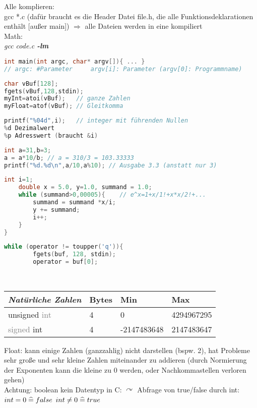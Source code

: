 \begin{multicols}{3}
Alle komplieren:\\
gcc *.c (dafür braucht es die Header Datei file.h, die alle Funktionsdeklarationen enthält [außer main]) $\Rightarrow$ alle Dateien werden in eine kompiliert \smallskip\\
Math:\\
\emph{gcc code.c \textbf{-lm}}
\HRule[4pt]
\begin{lstlisting}[language=C]
int main(int argc, char* argv[]){ ... } 
// argc: #Parameter		argv[i]: Parameter (argv[0]: Programmname)
\end{lstlisting}
\begin{lstlisting}[language=C]
char vBuf[128];
fgets(vBuf,128,stdin); 
myInt=atoi(vBuf);	// ganze Zahlen
myFloat=atof(vBuf); // Gleitkomma
\end{lstlisting}
\begin{lstlisting}[language=C]
printf("%04d",i);	// integer mit führenden Nullen
%d Dezimalwert
%p Adresswert (braucht &i)
\end{lstlisting}
\begin{lstlisting}[language=C]
int a=31,b=3;
a = a*10/b;	// a = 310/3 = 103.33333
printf("%d.%d\n",a/10,a%10); // Ausgabe 3.3 (anstatt nur 3)
\end{lstlisting}
\begin{lstlisting}[language=C]
	int i=1;
	double x = 5.0, y=1.0, summand = 1.0;
	while (summand>0,00005){	// e^x=1+x/1!+x*x/2!+...
		summand = summand *x/i;
		y += summand;
		i++;
	}
}
\end{lstlisting}
\begin{lstlisting}[language=C]
	while (operator != toupper('q')){
		fgets(buf, 128, stdin);
		operator = buf[0];
\end{lstlisting}
\HRule[4pt]
\\
\begin{tabular}{l | l l l}
\emph{Natürliche Zahlen} & Bytes & Min & Max\\
\hline
unsigned \textcolor{gray}{int}&4&0&4294967295\\
\textcolor{gray}{signed} int&4&-2147483648&2147483647\\
\end{tabular}

Float: kann einige Zahlen (ganzzahlig) nicht darstellen (bspw. 2), hat Probleme sehr große und sehr kleine Zahlen miteinander zu addieren (durch Normierung der Exponenten kann die kleine zu 0 werden, oder Nachkommastellen verloren gehen)\\
Achtung: boolean kein Datentyp in C: $\curvearrowright$ Abfrage von true/false durch int: 
$int=0\;\widehat{=}\; false$ \;
$int \not =0 \;\widehat{=}\; true$


\end{multicols}

